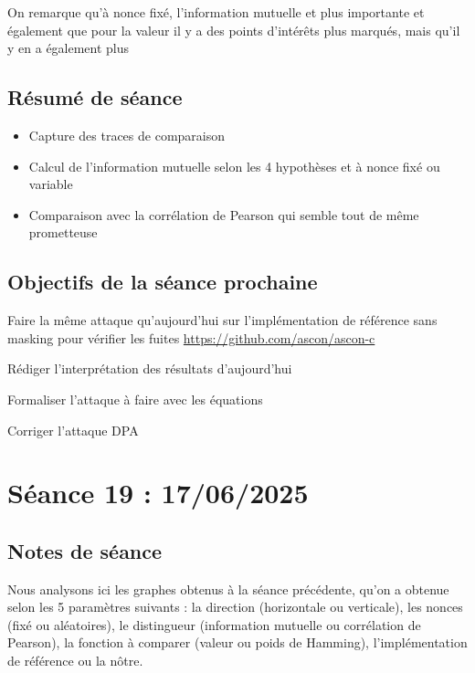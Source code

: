 \documentclass[12pt]{article}
\newcommand{\cmark}{\ding{51}}%
\newcommand{\xmark}{\ding{55}}%
\newcommand{\done}{\rlap{$\square$}{\raisebox{2pt}{\large\hspace{1pt}\cmark}}%
	\hspace{-2.5pt}}
\newcommand{\wontfix}{\rlap{$\square$}{\large\hspace{1pt}\xmark}}
\begin{document}
	\noindent On remarque qu'à nonce fixé, l'information mutuelle et plus importante et également que pour la valeur il y a des points d'intérêts plus marqués, mais qu'il y en a également plus
	
	\subsection{Résumé de séance}
	\begin{itemize}
		\item Capture des traces de comparaison
		\item Calcul de l'information mutuelle selon les 4 hypothèses et à nonce fixé ou variable
		\item Comparaison avec la corrélation de Pearson qui semble tout de même prometteuse
	\end{itemize}
	
	\subsection{Objectifs de la séance prochaine}
	\begin{todolist}
		\item[\done] Faire la même attaque qu’aujourd’hui sur l'implémentation de référence sans masking pour vérifier les fuites \url{https://github.com/ascon/ascon-c}
		\item[\done] Rédiger l'interprétation des résultats d'aujourd'hui
		\item[\wontfix] Formaliser l'attaque à faire avec les équations
		\item Corriger l'attaque DPA
	\end{todolist}
	
	
	\section{Séance 19 : 17/06/2025} \label{s19}
	\subsection{Notes de séance}
	Nous analysons ici les graphes obtenus à la séance précédente, qu'on a obtenue selon les 5 paramètres suivants : la direction (horizontale ou verticale), les nonces (fixé ou aléatoires), le distingueur (information mutuelle ou corrélation de Pearson), la fonction à comparer (valeur ou poids de Hamming), l'implémentation de référence ou la nôtre.
	
\end{document}
